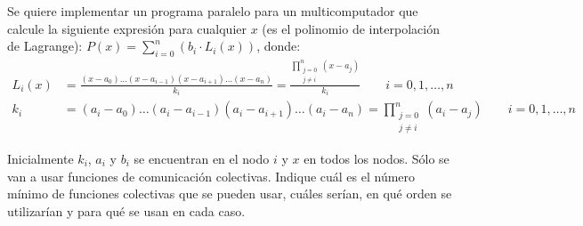 \begin{ejercicio}
    Se quiere implementar un programa paralelo para un multicomputador que calcule la siguiente
    expresión para cualquier $x$ (es el polinomio de interpolación de Lagrange):
    $P(x) = \sum\limits_{i=0}^{n} \left(b_i\cdot L_i(x)\right)$, donde:
    \begin{align*}
        L_i(x) &= \frac{(x-a_0) \ldots  (x-{a_{i-1}})(x-{a_{i+1}}) \ldots  (x-a_n)}{k_i}
        = \frac{\prod\limits_{\substack{j=0\\ j\neq i}}^{n} (x-a_j)}{k_i} \qquad i=0,1,\dots,n\\
        k_i &= (a_i-a_0) \ldots  (a_i-a_{i-1})(a_i-a_{i+1}) \ldots  (a_i-a_n)= \prod\limits_{\substack{j=0\\ j\neq i}}^{n} (a_i-a_j) \qquad i=0,1,\dots,n
    \end{align*}

    Inicialmente $k_i$, $a_i$ y $b_i$ se encuentran en el nodo $i$ y $x$ en todos los nodos. Sólo se van a usar funciones de
    comunicación colectivas. Indique cuál es el número mínimo de funciones colectivas que se pueden usar,
    cuáles serían, en qué orden se utilizarían y para qué se usan en cada caso.
\end{ejercicio}

